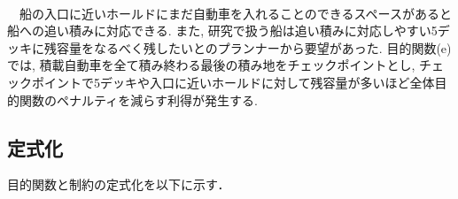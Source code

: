 \documentclass[a4j,11pt,twocolumn]{jsarticle}
\begin{document}
 \\
　船の入口に近いホールドにまだ自動車を入れることのできるスペースがあると船への追い積みに対応できる. また, 研究で扱う船は追い積みに対応しやすい5デッキに残容量をなるべく残したいとのプランナーから要望があった. 目的関数(e)では, 積載自動車を全て積み終わる最後の積み地をチェックポイントとし, チェックポイントで5デッキや入口に近いホールドに対して残容量が多いほど全体目的関数のペナルティを減らす利得が発生する. \\

\subsection{定式化}
目的関数と制約の定式化を以下に示す．
\end{document}
